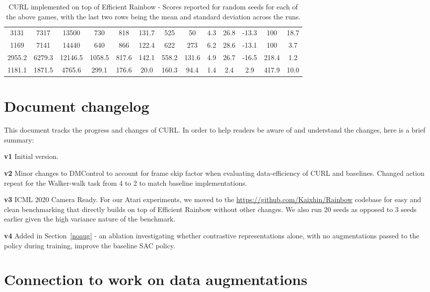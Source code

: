 \documentclass{article}
\begin{document}
\begin{table*}[!ht]
\begin{tabular}{c|c|c|c|c|c|c|c|c|c|c|c|c}
3131 &	7317 &	13500 &	730 &	818 &	131.7 &	525 &	50	 & 4.3	 & 26.8 &	-13.3 &	100 &	18.7 \\
1169 &	7141 &	14440 &	640 &	866 &	122.4 &	622 &	273 &	6.2 &	28.6 &	-13.1 &	100 &	3.7 \\
\hline
2955.2 & 6279.3 &	12146.5 &	1058.5 &	817.6 &	142.1 &	558.2 &	131.6 &	4.9 &	26.7 &	-16.5 &	218.4 & 1.2 \\
\hline
1181.1 & 1871.5 &	4765.6 &	299.1 &	176.6 &	20.0 &	160.3 &	94.4 &	1.4 &	2.4 & 2.9 & 417.9 &  10.0 \\
\hline
\end{tabular}
\vspace*{-0mm}
\caption{CURL implemented on top of Efficient Rainbow - Scores reported for  random seeds for each of the above games, with the last two rows being the mean and standard deviation across the runs.}
\label{tab:atari2}
\vspace{-2mm}
\end{table*} \section{Document changelog}

This document tracks the progress and changes of CURL. In order to help readers be aware of and understand the changes, here is a brief summary:

{\bf v1} Initial version.

{\bf v2} Minor changes to DMControl to account for frame skip factor when evaluating data-efficiency of CURL and baselines. Changed action repeat for the Walker-walk task from 4 to 2 to match baseline implementations.       

{\bf v3} ICML 2020 Camera Ready. For our Atari experiments, we moved to the \url{https://github.com/Kaixhin/Rainbow} codebase for easy and clean benchmarking that directly builds on top of Efficient Rainbow without other changes. We also run 20 seeds as opposed to 3 seeds earlier given the high variance nature of the benchmark.  

{\bf v4} Added in Section~\ref{noaug} - an ablation investigating whether contrastive representations alone, with no augmentations passed to the policy during training, improve the baseline SAC policy. \section{Connection to work on data augmentations}
\end{document}
